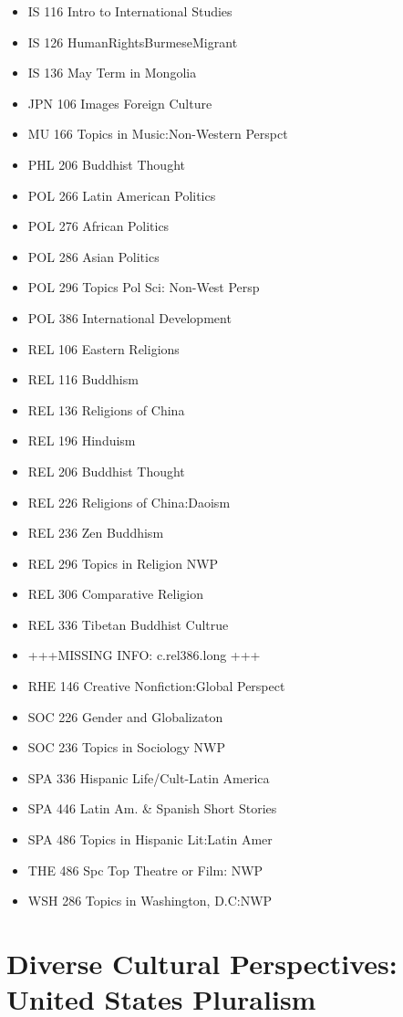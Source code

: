 \documentclass[
  letterpaper,
]{scrbook}
\begin{document}
\begin{itemize}
\item
  IS 116 Intro to International Studies
\item
  IS 126 HumanRightsBurmeseMigrant
\item
  IS 136 May Term in Mongolia
\item
  JPN 106 Images Foreign Culture
\item
  MU 166 Topics in Music:Non-Western Perspct
\item
  PHL 206 Buddhist Thought
\item
  POL 266 Latin American Politics
\item
  POL 276 African Politics
\item
  POL 286 Asian Politics
\item
  POL 296 Topics Pol Sci: Non-West Persp
\item
  POL 386 International Development
\item
  REL 106 Eastern Religions
\item
  REL 116 Buddhism
\item
  REL 136 Religions of China
\item
  REL 196 Hinduism
\item
  REL 206 Buddhist Thought
\item
  REL 226 Religions of China:Daoism
\item
  REL 236 Zen Buddhism
\item
  REL 296 Topics in Religion NWP
\item
  REL 306 Comparative Religion
\item
  REL 336 Tibetan Buddhist Cultrue
\item
  +++MISSING INFO: c.rel386.long +++
\item
  RHE 146 Creative Nonfiction:Global Perspect
\item
  SOC 226 Gender and Globalizaton
\item
  SOC 236 Topics in Sociology NWP
\item
  SPA 336 Hispanic Life/Cult-Latin America
\item
  SPA 446 Latin Am. \& Spanish Short Stories
\item
  SPA 486 Topics in Hispanic Lit:Latin Amer
\item
  THE 486 Spc Top Theatre or Film: NWP
\item
  WSH 286 Topics in Washington, D.C:NWP
\end{itemize}

\section{Diverse Cultural Perspectives: United States
Pluralism}\label{sec-diverse-cultural-perspectives-united-states}
\end{document}
